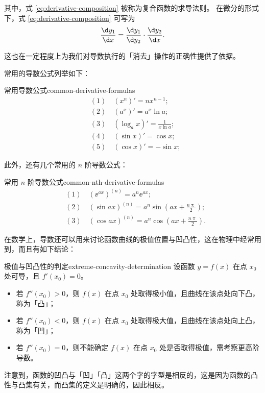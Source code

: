 其中，式 \cref{eq:derivative-composition} 被称为复合函数的求导法则。
在微分的形式下，式 \cref{eq:derivative-composition} 可写为
\begin{equation}
    \frac{\d y_1}{\d x} = \frac{\d y_1}{\d y_2} \cdot \frac{\d y_2}{\d x} .
\end{equation}

这也在一定程度上为我们对导数执行的「消去」操作的正确性提供了依据。
\bigskip

常用的导数公式列举如下：
\begin{physlist}{常用导数公式}{common-derivative-formulas}
    \begin{align}
         & (1)\quad (x^n)' = n x^{n-1} ;               \\
         & (2)\quad (a^x)' = a^x \ln a ;               \\
         & (3)\quad (\log _a x)' = \frac{1}{x \ln a} ; \\
         & (4)\quad (\sin x)' = \cos x ;               \\
         & (5)\quad (\cos x)' = -\sin x ;
    \end{align}

\end{physlist}

此外，还有几个常用的 $ n $ 阶导数公式：
\begin{physlist}{常用 $ n $ 阶导数公式}{common-nth-derivative-formulas}
    \begin{align}
         & (1)\quad (\ee^{a x})^{(n)} = a^n \ee^{a x} ;                                  \\
         & (2)\quad (\sin a x)^{(n)} = a^n \sin \left( a x + \frac{n \uppi}{2} \right) ; \\
         & (3)\quad (\cos a x)^{(n)} = a^n \cos \left( a x + \frac{n \uppi}{2} \right) .
    \end{align}

\end{physlist}

在数学上，导数还可以用来讨论函数曲线的极值位置与凹凸性，这在物理中经常用到，而且有如下结论：
\begin{definition}{极值与凹凸性的判定}{extreme-concavity-determination}
    设函数 $ y = f(x) $ 在点 $ x_0 $ 处可导，且 $ f'(x_0) = 0 $。
    \begin{itemize}
        \item 若 $ f''(x_0) > 0 $，则 $ f(x) $ 在点 $ x_0 $ 处取得极小值，且曲线在该点处向下凸，称为「凸」；
        \item 若 $ f''(x_0) < 0 $，则 $ f(x) $ 在点 $ x_0 $ 处取得极大值，且曲线在该点处向上凸，称为「凹」；
        \item 若 $ f''(x_0) = 0 $，则不能确定 $ f(x) $ 在点 $ x_0 $ 处是否取得极值，需考察更高阶导数。
    \end{itemize}

    注意到，函数的凹凸与「凹」「凸」这两个字的字型是相反的，这是因为函数的凸性与凸集有关，而凸集的定义是明确的，因此相反。

\end{definition}

